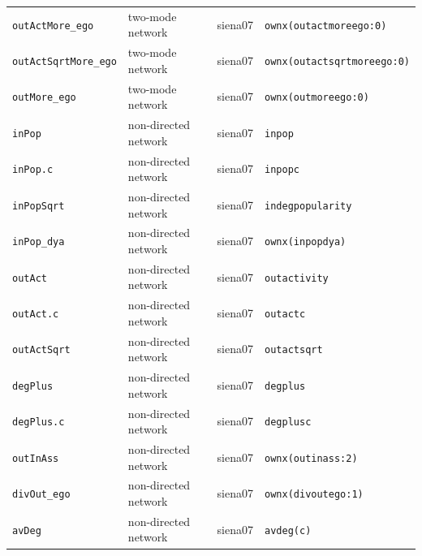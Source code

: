 \begin{longtable}{@{}p{2.6cm}p{3.2cm}p{2.9cm}p{5.4cm}@{}}
\texttt{outActMore\_ego} & two-mode network & siena07 & \texttt{ownx(outactmoreego:0)}\\
\texttt{outActSqrtMore\_ego} & two-mode network & siena07 & \texttt{ownx(outactsqrtmoreego:0)}\\
\texttt{outMore\_ego} & two-mode network & siena07 & \texttt{ownx(outmoreego:0)}\\
\texttt{inPop} & non-directed network & siena07 & \texttt{inpop}\\
\texttt{inPop.c} & non-directed network & siena07 & \texttt{inpopc}\\
\texttt{inPopSqrt} & non-directed network & siena07 & \texttt{indegpopularity}\\
\texttt{inPop\_dya} & non-directed network & siena07 & \texttt{ownx(inpopdya)}\\
\texttt{outAct} & non-directed network & siena07 & \texttt{outactivity}\\
\texttt{outAct.c} & non-directed network & siena07 & \texttt{outactc}\\
\texttt{outActSqrt} & non-directed network & siena07 & \texttt{outactsqrt}\\
\texttt{degPlus} & non-directed network & siena07 & \texttt{degplus}\\
\texttt{degPlus.c} & non-directed network & siena07 & \texttt{degplusc}\\
\texttt{outInAss} & non-directed network & siena07 & \texttt{ownx(outinass:2)}\\
\texttt{divOut\_ego} & non-directed network & siena07 & \texttt{ownx(divoutego:1)}\\
\texttt{avDeg} & non-directed network & siena07 & \texttt{avdeg(c)}\\
\bottomrule
\end{longtable}
\normalsize

